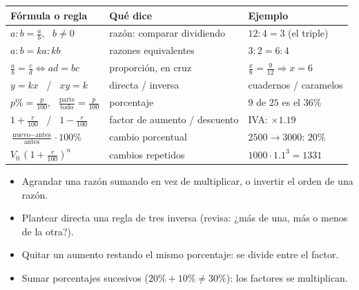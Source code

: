 \documentclass[11pt,a4paper]{article}
\begin{document}
\repaso
\begin{center}\small
\begin{tabularx}{\linewidth}{@{}>{\centering\arraybackslash}p{46mm} L >{\raggedright\arraybackslash}p{44mm}@{}}
\toprule
Fórmula o regla & Qué dice & Ejemplo\\ \midrule
$a:b=\tfrac ab$, \ $b\neq0$ & razón: comparar dividiendo & $12:4=3$ (el triple)\\
$a:b=ka:kb$ & razones equivalentes & $3:2=6:4$\\
$\tfrac ab=\tfrac cd\iff ad=bc$ & proporción, en cruz & $\tfrac x8=\tfrac9{12}\Rightarrow x=6$\\
$y=kx$ \ / \ $xy=k$ & directa / inversa & cuadernos / caramelos\\
$p\%=\tfrac p{100}$, \ $\tfrac{\text{parte}}{\text{todo}}=\tfrac p{100}$ & porcentaje & $9$ de $25$ es el $36\%$\\
$1+\tfrac r{100}$ \ / \ $1-\tfrac r{100}$ & factor de aumento / descuento & IVA: $\times1.19$\\
$\tfrac{\text{nuevo}-\text{antes}}{\text{antes}}\cdot100\%$ & cambio porcentual & $2500\to3000$: $20\%$\\
$V_0\,(1+\tfrac r{100})^n$ & cambios repetidos & $1000\cdot1.1^3=1331$\\
\bottomrule
\end{tabularx}
\end{center}
\begin{ojo}
\begin{itemize}
\item Agrandar una razón sumando en vez de multiplicar, o invertir el orden de una razón.
\item Plantear directa una regla de tres inversa (revisa: ¿más de una, más o menos de la otra?).
\item Quitar un aumento restando el mismo porcentaje: se divide entre el factor.
\item Sumar porcentajes sucesivos ($20\%+10\%\neq30\%$): los factores se multiplican.
\end{itemize}
\end{ojo}
\end{document}
